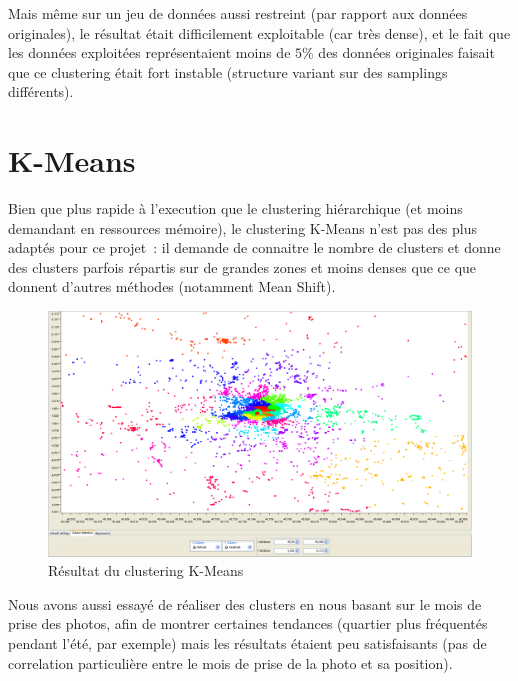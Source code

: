     Mais même sur un jeu de données aussi restreint (par rapport aux données
    originales), le résultat était difficilement exploitable (car très dense),
    et le fait que les données exploitées représentaient moins de $5\%$ des
    données originales faisait que ce clustering était fort instable (structure
    variant sur des samplings différents).

\section{K-Means}
    Bien que plus rapide à l'execution que le clustering hiérarchique (et moins demandant en ressources mémoire),
    le clustering K-Means n'est pas des plus adaptés pour ce projet~: il demande de connaitre le nombre de clusters et
    donne des clusters parfois répartis sur de grandes zones et moins denses que ce que donnent d'autres méthodes (notamment Mean Shift).

    \begin{figure}[H]
        \centering
        \includegraphics[scale=0.25]{../screenshots/kmeans_geographic.png}
        \caption{Résultat du clustering K-Means}
        \label{diagram:kmeans_geographic}
    \end{figure}

    Nous avons aussi essayé de réaliser des clusters en nous basant sur le mois de prise des photos, afin de montrer certaines tendances (quartier plus fréquentés pendant l'été, par exemple) mais les résultats étaient peu satisfaisants (pas de correlation particulière entre le mois de prise de la photo et sa position).

